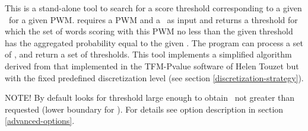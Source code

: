 This is a stand-alone tool to search for a score threshold corresponding to a given \pvalue\ for a given PWM.
 requires a PWM and a \pvalue\ as input and returns a threshold for which the set of
words scoring with this PWM no less than the given threshold has the aggregated probability equal to
the given \pvalue. The program can process a set of \pvalues, and return a set of thresholds.
This tool implements a simplified algorithm derived from that implemented in the TFM-Pvalue software of
Helen Touzet  but with the fixed predefined discretization level (see section \ref{discretization-strategy}).

\usageheader
{}


NOTE! By default  looks for threshold large enough to obtain \pvalue\ not 
greater than requested (lower boundary for \pvalue). For details see  option description in section \ref{advanced-options}.

